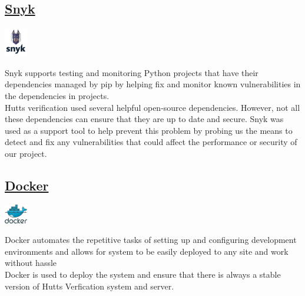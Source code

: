\documentclass{article}
\begin{document}
		\cleardoublepage
		\begin{minipage}[b]{0.15\linewidth}
			\subsection{\href{https://snyk.io}{Snyk}}
			\vspace{5mm}
		\end{minipage}
		\begin{minipage}[b]{0.85\linewidth}
			\includegraphics[width=1.0cm]{img/snyk.png}
		\end{minipage}
		Snyk supports testing and monitoring Python projects that have their dependencies
		managed by pip by helping fix and monitor known vulnerabilities in the dependencies in projects.\\

		\noindent
		Hutts verification used several helpful open-source dependencies. However, not all these
		dependencies can ensure that they are up to date and secure.
	    Snyk was used as a support tool to help prevent this problem by probing us the means
	    to detect and fix any vulnerabilities that could affect the performance or security of our project.\\
	    
	    \begin{minipage}[b]{0.18\linewidth}
			\subsection{\href{https://www.docker.com}{Docker}}
			\vspace{1mm}
		\end{minipage}
		\begin{minipage}[b]{0.82\linewidth}
			\includegraphics[width=1.0cm]{img/docker.png}
		\end{minipage}
		Docker automates the repetitive tasks of setting up and configuring development environments and allows for
		system to be easily deployed to any site and work without hassle\\
		
		Docker is used to deploy the system and ensure that there is always a stable version of Hutts Verfication system
		and server.
	
	\cleardoublepage
\end{document}
